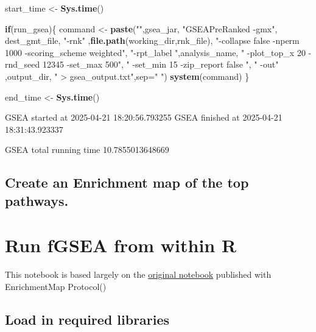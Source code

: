 \documentclass[
]{book}
\newenvironment{Shaded}{\begin{snugshade}}{\end{snugshade}}
\newcommand{\AttributeTok}[1]{\textcolor[rgb]{0.13,0.29,0.53}{#1}}
\newcommand{\ControlFlowTok}[1]{\textcolor[rgb]{0.13,0.29,0.53}{\textbf{#1}}}
\newcommand{\FunctionTok}[1]{\textcolor[rgb]{0.13,0.29,0.53}{\textbf{#1}}}
\newcommand{\NormalTok}[1]{#1}
\newcommand{\OtherTok}[1]{\textcolor[rgb]{0.56,0.35,0.01}{#1}}
\newcommand{\StringTok}[1]{\textcolor[rgb]{0.31,0.60,0.02}{#1}}
\begin{document}
\begin{Shaded}
\begin{Highlighting}[]
\NormalTok{start\_time }\OtherTok{\textless{}{-}} \FunctionTok{Sys.time}\NormalTok{()}

\ControlFlowTok{if}\NormalTok{(run\_gsea)\{}
\NormalTok{  command }\OtherTok{\textless{}{-}} \FunctionTok{paste}\NormalTok{(}\StringTok{""}\NormalTok{,gsea\_jar,  }
                   \StringTok{"GSEAPreRanked {-}gmx"}\NormalTok{, dest\_gmt\_file, }
                   \StringTok{"{-}rnk"}\NormalTok{ ,}\FunctionTok{file.path}\NormalTok{(working\_dir,rnk\_file), }
                   \StringTok{"{-}collapse false {-}nperm 1000 {-}scoring\_scheme weighted"}\NormalTok{, }
                   \StringTok{"{-}rpt\_label "}\NormalTok{,analysis\_name,}
                   \StringTok{"  {-}plot\_top\_x 20 {-}rnd\_seed 12345  {-}set\_max 500"}\NormalTok{,  }
                   \StringTok{" {-}set\_min 15 {-}zip\_report false "}\NormalTok{,}
                   \StringTok{" {-}out"}\NormalTok{ ,output\_dir, }
                   \StringTok{" \textgreater{} gsea\_output.txt"}\NormalTok{,}\AttributeTok{sep=}\StringTok{" "}\NormalTok{)}
  \FunctionTok{system}\NormalTok{(command)}
\NormalTok{\}}

\NormalTok{end\_time }\OtherTok{\textless{}{-}} \FunctionTok{Sys.time}\NormalTok{()}
\end{Highlighting}
\end{Shaded}

GSEA started at 2025-04-21 18:20:56.793255
GSEA finished at 2025-04-21 18:31:43.923337

GSEA total running time 10.7855013648669

\section{Create an Enrichment map of the top pathways.}\label{create-an-enrichment-map-of-the-top-pathways.}

\chapter{Run fGSEA from within R}\label{run-fgsea-from-within-r}

This notebook is based largely on the \href{https://baderlab.github.io/Cytoscape_workflows/EnrichmentMapPipeline/Protocol2_createEM.html}{original notebook} published with EnrichmentMap Protocol()

\section{Load in required libraries}\label{load-in-required-libraries-1}
\end{document}
